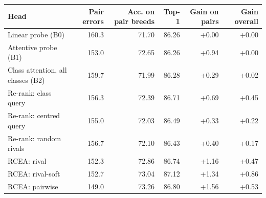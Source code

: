 \begin{tabular}{lrrrrr}
\toprule
Head & Pair errors & Acc. on pair breeds & Top-1 & Gain on pairs & Gain overall \\
\midrule
Linear probe (B0) & 160.3 & 71.70 & 86.26 & +0.00 & +0.00 \\
Attentive probe (B1) & 153.0 & 72.65 & 86.26 & +0.94 & +0.00 \\
Class attention, all classes (B2) & 159.7 & 71.99 & 86.28 & +0.29 & +0.02 \\
Re-rank: class query & 156.3 & 72.39 & 86.71 & +0.69 & +0.45 \\
Re-rank: centred query & 155.0 & 72.03 & 86.49 & +0.33 & +0.22 \\
Re-rank: random rivals & 156.7 & 72.10 & 86.43 & +0.40 & +0.17 \\
RCEA: rival & 152.3 & 72.86 & 86.74 & +1.16 & +0.47 \\
RCEA: rival-soft & 152.7 & 73.04 & 87.12 & +1.34 & +0.86 \\
RCEA: pairwise & 149.0 & 73.26 & 86.80 & +1.56 & +0.53 \\
\bottomrule
\end{tabular}
